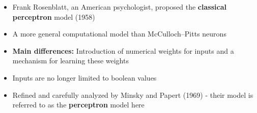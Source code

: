 \documentclass[serif, aspectratio=169]{beamer}
\begin{document}
\begin{frame}
\begin{columns}
		\begin{overlayarea}{\textwidth}{\textheight}
			\begin{itemize}\justifying
				\item<1-> Frank Rosenblatt, an American psychologist, proposed the \textbf{classical perceptron} model (1958)
				\item<3-> A more general computational model than McCulloch–Pitts neurons
				\item<4-> \textbf{Main differences:} Introduction of numerical weights for inputs and a mechanism for learning these weights
				\item<5-> Inputs are no longer limited to boolean values
				\item<6-> Refined and carefully analyzed by Minsky and Papert (1969) - their model is referred to as the \textbf{perceptron} model here
			\end{itemize}
		\end{overlayarea}
	\end{columns}
\end{frame}
\end{document}

